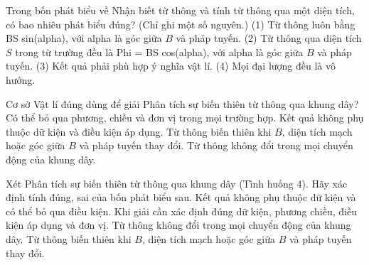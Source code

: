 \begin{ex}
Trong bốn phát biểu về Nhận biết từ thông và tính từ thông qua một diện tích, có bao nhiêu phát biểu đúng? (Chỉ ghi một số nguyên.) (1) Từ thông luôn bằng BS sin(alpha), với alpha là góc giữa $B$ và pháp tuyến. (2) Từ thông qua diện tích $S$ trong từ trường đều là Phi = BS cos(alpha), với alpha là góc giữa $B$ và pháp tuyến. (3) Kết quả phải phù hợp ý nghĩa vật lí. (4) Mọi đại lượng đều là vô hướng.
\end{ex}

\begin{ex}
Cơ sở Vật lí đúng dùng để giải Phân tích sự biến thiên từ thông qua khung dây?
\choice
{Có thể bỏ qua phương, chiều và đơn vị trong mọi trường hợp.}
{Kết quả không phụ thuộc dữ kiện và điều kiện áp dụng.}
{\True Từ thông biến thiên khi $B$, diện tích mạch hoặc góc giữa $B$ và pháp tuyến thay đổi.}
{Từ thông không đổi trong mọi chuyển động của khung dây.}
\end{ex}

\begin{ex}
Xét Phân tích sự biến thiên từ thông qua khung dây (Tình huống 4). Hãy xác định tính đúng, sai của bốn phát biểu sau.
\choiceTF
{Kết quả không phụ thuộc dữ kiện và có thể bỏ qua điều kiện.}
{\True Khi giải cần xác định đúng dữ kiện, phương chiều, điều kiện áp dụng và đơn vị.}
{Từ thông không đổi trong mọi chuyển động của khung dây.}
{\True Từ thông biến thiên khi $B$, diện tích mạch hoặc góc giữa $B$ và pháp tuyến thay đổi.}
\end{ex}

